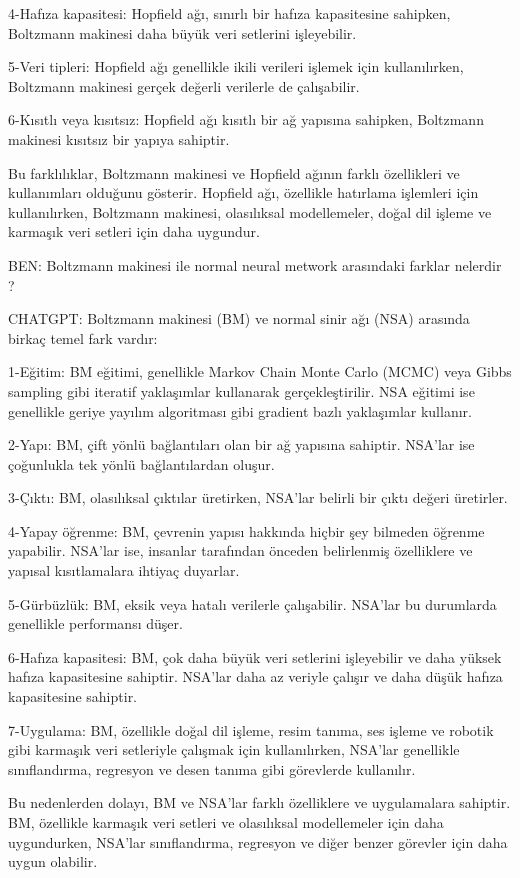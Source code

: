 \documentclass[11pt]{article}
\begin{document}
4-Hafıza kapasitesi: Hopfield ağı, sınırlı bir hafıza kapasitesine sahipken, Boltzmann makinesi daha büyük veri setlerini işleyebilir.

5-Veri tipleri: Hopfield ağı genellikle ikili verileri işlemek için kullanılırken, Boltzmann makinesi gerçek değerli verilerle de çalışabilir.

6-Kısıtlı veya kısıtsız: Hopfield ağı kısıtlı bir ağ yapısına sahipken, Boltzmann makinesi kısıtsız bir yapıya sahiptir.

Bu farklılıklar, Boltzmann makinesi ve Hopfield ağının farklı özellikleri ve kullanımları olduğunu gösterir. Hopfield ağı, özellikle hatırlama işlemleri için kullanılırken, Boltzmann makinesi, olasılıksal modellemeler, doğal dil işleme ve karmaşık veri setleri için daha uygundur.

BEN: Boltzmann makinesi ile normal neural metwork arasındaki farklar nelerdir ?

CHATGPT: Boltzmann makinesi (BM) ve normal sinir ağı (NSA) arasında birkaç temel fark vardır:

1-Eğitim: BM eğitimi, genellikle Markov Chain Monte Carlo (MCMC) veya Gibbs sampling gibi iteratif yaklaşımlar kullanarak gerçekleştirilir. NSA eğitimi ise genellikle geriye yayılım algoritması gibi gradient bazlı yaklaşımlar kullanır.

2-Yapı: BM, çift yönlü bağlantıları olan bir ağ yapısına sahiptir. NSA'lar ise çoğunlukla tek yönlü bağlantılardan oluşur.

3-Çıktı: BM, olasılıksal çıktılar üretirken, NSA'lar belirli bir çıktı değeri üretirler.

4-Yapay öğrenme: BM, çevrenin yapısı hakkında hiçbir şey bilmeden öğrenme yapabilir. NSA'lar ise, insanlar tarafından önceden belirlenmiş özelliklere ve yapısal kısıtlamalara ihtiyaç duyarlar.

5-Gürbüzlük: BM, eksik veya hatalı verilerle çalışabilir. NSA'lar bu durumlarda genellikle performansı düşer.

6-Hafıza kapasitesi: BM, çok daha büyük veri setlerini işleyebilir ve daha yüksek hafıza kapasitesine sahiptir. NSA'lar daha az veriyle çalışır ve daha düşük hafıza kapasitesine sahiptir.

7-Uygulama: BM, özellikle doğal dil işleme, resim tanıma, ses işleme ve robotik gibi karmaşık veri setleriyle çalışmak için kullanılırken, NSA'lar genellikle sınıflandırma, regresyon ve desen tanıma gibi görevlerde kullanılır.

Bu nedenlerden dolayı, BM ve NSA'lar farklı özelliklere ve uygulamalara sahiptir. BM, özellikle karmaşık veri setleri ve olasılıksal modellemeler için daha uygundurken, NSA'lar sınıflandırma, regresyon ve diğer benzer görevler için daha uygun olabilir.
\end{document}
